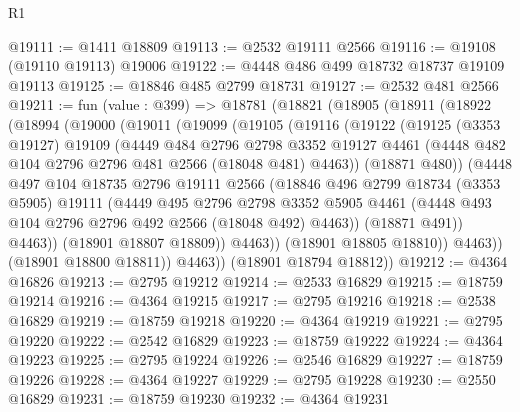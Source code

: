\begin{lexlean}{R1}
\begin{coremodule}
@19111 := @1411 @18809
@19113 := @2532 @19111 @2566
@19116 := @19108 (@19110 @19113) @19006
@19122 := @4448 @486 @499 @18732 @18737 @19109 @19113
@19125 := @18846 @485 @2799 @18731
@19127 := @2532 @481 @2566
@19211 := fun (value : @399) =>
  @18781
    (@18821
      (@18905
        (@18911
          (@18922
            (@18994
              (@19000
                (@19011
                  (@19099
                    (@19105
                      (@19116
                        (@19122
                          (@19125
                            (@3353 @19127)
                            @19109
                            (@4449
                              @484
                              @2796
                              @2798
                              @3352
                              @19127
                              @4461
                              (@4448 @482 @104 @2796 @2796 @481 @2566 (@18048 @481) @4463))
                            (@18871 @480))
                          (@4448
                            @497
                            @104
                            @18735
                            @2796
                            @19111
                            @2566
                            (@18846
                              @496
                              @2799
                              @18734
                              (@3353 @5905)
                              @19111
                              (@4449
                                @495
                                @2796
                                @2798
                                @3352
                                @5905
                                @4461
                                (@4448 @493 @104 @2796 @2796 @492 @2566 (@18048 @492) @4463))
                              (@18871 @491))
                            @4463))
                        (@18901 @18807 @18809))
                      @4463))
                  (@18901 @18805 @18810))
                @4463))
            (@18901 @18800 @18811))
          @4463))
      (@18901 @18794 @18812))
@19212 := @4364 @16826
@19213 := @2795 @19212
@19214 := @2533 @16829
@19215 := @18759 @19214
@19216 := @4364 @19215
@19217 := @2795 @19216
@19218 := @2538 @16829
@19219 := @18759 @19218
@19220 := @4364 @19219
@19221 := @2795 @19220
@19222 := @2542 @16829
@19223 := @18759 @19222
@19224 := @4364 @19223
@19225 := @2795 @19224
@19226 := @2546 @16829
@19227 := @18759 @19226
@19228 := @4364 @19227
@19229 := @2795 @19228
@19230 := @2550 @16829
@19231 := @18759 @19230
@19232 := @4364 @19231

\end{coremodule}
\end{lexlean}
